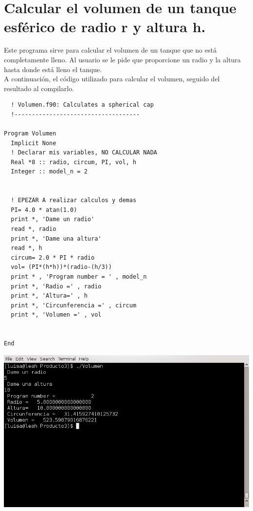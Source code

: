\documentclass[10pt]{article}
\begin{document}
\section{Calcular el volumen de un tanque esférico de radio r y altura h.}
Este programa sirve para calcular el volumen de un tanque que no está completamente lleno. Al usuario se le pide que proporcione un radio y la altura hasta donde está lleno el tanque.\\
A continuación, el código utilizado para calcular el volumen, seguido del resultado al compilarlo.

\begin{verbatim}
  ! Volumen.f90: Calculates a spherical cap
  !------------------------------------

Program Volumen
  Implicit None
  ! Declarar mis variables, NO CALCULAR NADA
  Real *8 :: radio, circum, PI, vol, h
  Integer :: model_n = 2
  
  
  ! EPEZAR A realizar calculos y demas
  PI= 4.0 * atan(1.0)
  print *, 'Dame un radio'
  read *, radio
  print *, 'Dame una altura'
  read *, h
  circum= 2.0 * PI * radio
  vol= (PI*(h*h))*(radio-(h/3))
  print * , 'Program number = ' , model_n
  print *, 'Radio =' , radio
  print *, 'Altura=' , h
  print *, 'Circunferencia =' , circum
  print *, 'Volumen =' , vol
  
  
End 
\end{verbatim}
\includegraphics[scale=0.6]{Volumen}
\end{document}
